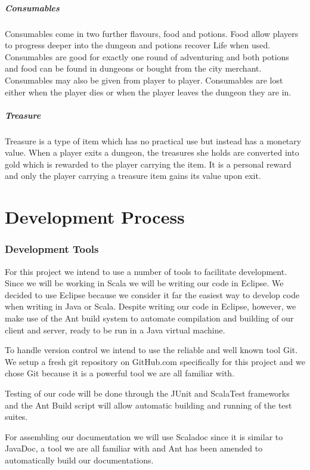 \documentclass[a4paper]{article}
\begin{document}
\subsubsection{Consumables}
Consumables come in two further flavours, food and potions. Food allow players to progress deeper into the dungeon and potions recover Life when used. Consumables are good for exactly 
one round of adventuring and both potions and food can be found in dungeons or bought from the city merchant. Consumables may also be given from player to player. Consumables are lost 
either when the player dies or when the player leaves the dungeon they are in.

\subsubsection{Treasure}
Treasure is a type of item which has no practical use but instead has a monetary value. When a player exits a dungeon, the treasures she holds are converted into gold which is rewarded 
to the player carrying the item. It is a personal reward and only the player carrying a treasure item gains its value upon exit.
\part{Development Process}
\section{Development Tools}
For this project we intend to use a number of tools to facilitate development.
Since we will be working in Scala we will be writing our code in Eclipse. We decided to use Eclipse because we consider it far the easiest way to develop code 
when writing in Java or Scala. Despite writing our code in Eclipse, however, we make use of the Ant build system to automate compilation and building of our client and server, ready 
to be run in a Java virtual machine.
 
To handle version control we intend to use the reliable and well known tool Git. We setup a fresh git repository on GitHub.com specifically for this project and we chose 
Git because it is a powerful tool we are all familiar with.

Testing of our code will be done through the JUnit and ScalaTest frameworks and the Ant Build script will allow automatic building and running of the test suites.

For assembling our documentation we will use Scaladoc since it is similar to JavaDoc, a tool we are all familiar with and Ant has been amended to automatically build our documentations.
\end{document}
